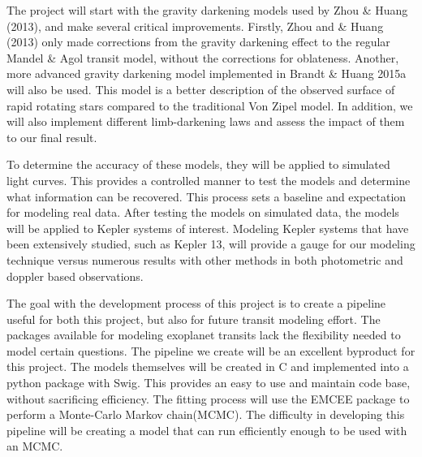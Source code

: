 \documentclass{article}
\begin{document}
The project will start with the gravity darkening models used by Zhou \& Huang (2013), and make several critical improvements.
Firstly, Zhou and \& Huang (2013) only made corrections from the gravity darkening effect to the regular Mandel \& Agol transit model, without the corrections for oblateness.
Another, more advanced gravity darkening model implemented in Brandt \& Huang 2015a will also be used.
This model is a better description of the observed surface of rapid rotating stars compared to the traditional Von Zipel model.
In addition, we will also implement different limb-darkening laws and assess the impact of them to our final result.

To determine the accuracy of these models, they will be applied to simulated light curves.
This provides a controlled manner to test the models and determine what information can be recovered.
This process sets a baseline and expectation for modeling real data.
After testing the models on simulated data, the models will be applied to Kepler systems of interest.
Modeling Kepler systems that have been extensively studied, such as Kepler 13, will provide a gauge for our modeling technique versus numerous results with other methods in both photometric and doppler based observations.


The goal with the development process of this project is to create a pipeline useful for both this project, but also for future transit modeling effort.
The packages available for modeling exoplanet transits lack the flexibility needed to model certain questions.
The pipeline we create will be an excellent byproduct for this project.
The models themselves will be created in C and implemented into a python package with Swig.
This provides an easy to use and maintain code base, without sacrificing efficiency.
The fitting process will use the EMCEE package to perform a Monte-Carlo Markov chain(MCMC).
The difficulty in developing this pipeline will be creating a model that can run efficiently enough to be used with an MCMC.
\end{document}
